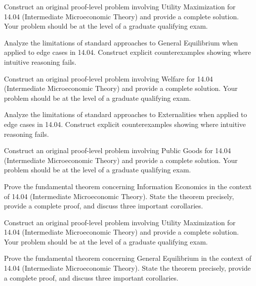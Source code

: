 \documentclass[12pt,a4paper]{exam}
\begin{document}
\begin{questions}

\question[5]
Construct an original proof-level problem involving Utility Maximization for 14.04 (Intermediate Microeconomic Theory) and provide a complete solution. Your problem should be at the level of a graduate qualifying exam.

\vspace{0.3cm}

\question[4]
Analyze the limitations of standard approaches to General Equilibrium when applied to edge cases in 14.04. Construct explicit counterexamples showing where intuitive reasoning fails.

\vspace{0.3cm}

\question[3]
Construct an original proof-level problem involving Welfare for 14.04 (Intermediate Microeconomic Theory) and provide a complete solution. Your problem should be at the level of a graduate qualifying exam.

\vspace{0.3cm}

\question[2]
Analyze the limitations of standard approaches to Externalities when applied to edge cases in 14.04. Construct explicit counterexamples showing where intuitive reasoning fails.

\vspace{0.3cm}

\question[6]
Construct an original proof-level problem involving Public Goods for 14.04 (Intermediate Microeconomic Theory) and provide a complete solution. Your problem should be at the level of a graduate qualifying exam.

\vspace{0.3cm}

\question[4]
Prove the fundamental theorem concerning Information Economics in the context of 14.04 (Intermediate Microeconomic Theory). State the theorem precisely, provide a complete proof, and discuss three important corollaries.

\vspace{0.3cm}

\question[6]
Construct an original proof-level problem involving Utility Maximization for 14.04 (Intermediate Microeconomic Theory) and provide a complete solution. Your problem should be at the level of a graduate qualifying exam.

\vspace{0.3cm}

\question[4]
Prove the fundamental theorem concerning General Equilibrium in the context of 14.04 (Intermediate Microeconomic Theory). State the theorem precisely, provide a complete proof, and discuss three important corollaries.


\end{questions}
\end{document}
